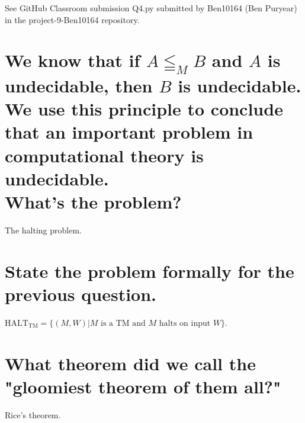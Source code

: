 \documentclass{article}
\begin{document}
See GitHub Classroom submission Q4.py submitted by Ben10164 (Ben Puryear) in the project-9-Ben10164 repository.

\section{We know that if $A \leqq_M B$ and $A$ is undecidable, then $B$ is undecidable. We use this principle to conclude that an important problem in computational theory is undecidable.\\What's the problem?}

The halting problem.

\section{State the problem formally for the previous question.}

$\text{HALT}_\text{TM} = \{(M,W)| M \text{ is a TM and } M \text{ halts on input } W\}$.

\section{What theorem did we call the "gloomiest theorem of them all?"}

Rice's theorem.
\end{document}
